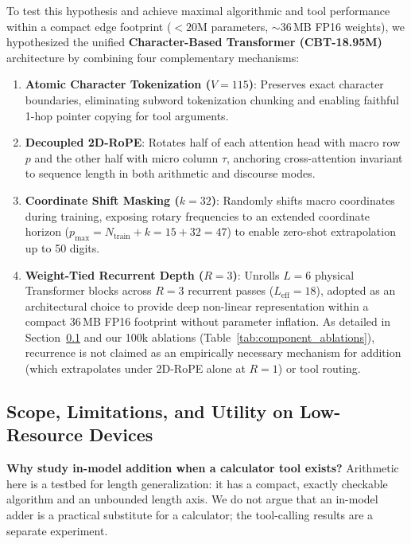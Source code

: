 \documentclass[10pt,twocolumn]{article}
\begin{document}
To test this hypothesis and achieve maximal algorithmic and tool performance within a compact edge footprint ($< 20$M parameters, $\sim$36\,MB FP16 weights), we hypothesized the unified \textbf{Character-Based Transformer (CBT-18.95M)} architecture by combining four complementary mechanisms:
\begin{enumerate}[leftmargin=*,nosep]
    \item \textbf{Atomic Character Tokenization ($V=115$)}: Preserves exact character boundaries, eliminating subword tokenization chunking and enabling faithful 1-hop pointer copying for tool arguments.
    \item \textbf{Decoupled 2D-RoPE}: Rotates half of each attention head with macro row $p$ and the other half with micro column $\tau$, anchoring cross-attention invariant to sequence length in both arithmetic and discourse modes.
    \item \textbf{Coordinate Shift Masking ($k=32$)}: Randomly shifts macro coordinates during training, exposing rotary frequencies to an extended coordinate horizon ($p_{\max} = N_{\text{train}} + k = 15 + 32 = 47$) to enable zero-shot extrapolation up to 50 digits.
    \item \textbf{Weight-Tied Recurrent Depth ($R=3$)}: Unrolls $L=6$ physical Transformer blocks across $R=3$ recurrent passes ($L_{\text{eff}}=18$), adopted as an architectural choice to provide deep non-linear representation within a compact 36\,MB FP16 footprint without parameter inflation. As detailed in Section~\ref{sec:limitations} and our 100k ablations (Table~\ref{tab:component_ablations}), recurrence is not claimed as an empirically necessary mechanism for addition (which extrapolates under 2D-RoPE alone at $R=1$) or tool routing.
\end{enumerate}

\subsection{Scope, Limitations, and Utility on Low-Resource Devices}
\label{sec:limitations}

\textbf{Why study in-model addition when a calculator tool exists?} Arithmetic here is a testbed for length generalization: it has a compact, exactly checkable algorithm and an unbounded length axis. We do not argue that an in-model adder is a practical substitute for a calculator; the tool-calling results are a separate experiment.
\end{document}

